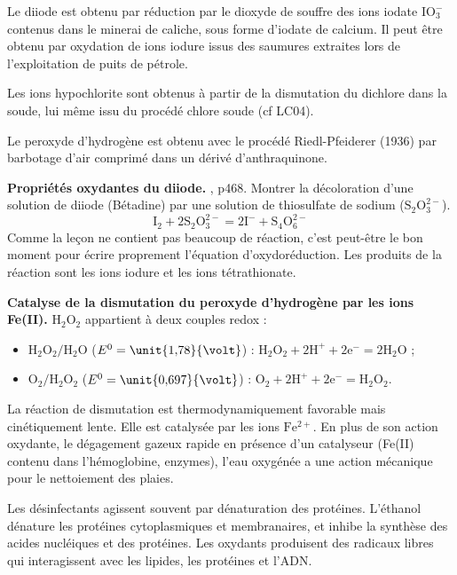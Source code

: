 \begin{remarque}
Le diiode est obtenu par réduction par le dioxyde de souffre des ions iodate $\mathrm{IO_3^-}$ contenus dans le minerai de caliche, sous forme d'iodate de calcium.
Il peut être obtenu par oxydation de ions iodure issus des saumures extraites lors de l'exploitation de puits de pétrole.

\noindent
Les ions hypochlorite sont obtenus à partir de la dismutation du dichlore dans la soude, lui même issu du procédé chlore soude (cf LC04).

\noindent
Le peroxyde d'hydrogène est obtenu avec le procédé Riedl-Pfeiderer (1936) par barbotage d'air comprimé dans un dérivé d'anthraquinone.
\end{remarque}

\begin{experience}
\textbf{Propriétés oxydantes du diiode.}
\cite{Dulaurans2012}, p468.
Montrer la décoloration d'une solution de diiode (Bétadine) par une solution de thiosulfate de sodium ($\mathrm{S_2O_3^{2-}}$).
\begin{equation}
\mathrm{I_2 + 2S_2O_3^{2-} = 2I^- + S_4O_6^{2-}}
\end{equation}
Comme la leçon ne contient pas beaucoup de réaction, c'est peut-être le bon moment pour écrire proprement l'équation d'oxydoréduction.
Les produits de la réaction sont les ions iodure et les ions tétrathionate. 
\end{experience}

\begin{experience}
\textbf{Catalyse de la dismutation du peroxyde d'hydrogène par les ions Fe(II).}
$\mathrm{H_2O_2}$ appartient à deux couples redox :
\begin{itemize}
\item $\mathrm{H_2O_2/H_2O}$ ($E^0 = \unit{1{,}78}{\volt}$) : $\mathrm{H_2O_2 + 2H^+ + 2e^- = 2H_2O}$ ;
\item $\mathrm{O_2/H_2O_2}$ ($E^0 = \unit{0{,}697}{\volt}$) : $\mathrm{O_2 + 2H^+ + 2e^- = H_2O_2}$.
\end{itemize}
La réaction de dismutation est thermodynamiquement favorable mais cinétiquement lente.
Elle est catalysée par les ions $\mathrm{Fe^{2+}}$.
En plus de son action oxydante, le dégagement gazeux rapide en présence d'un catalyseur (Fe(II) contenu dans l'hémoglobine, enzymes), l'eau oxygénée a une action mécanique pour le nettoiement des plaies.
\end{experience}

\begin{remarque}
Les désinfectants agissent souvent par dénaturation des protéines.
L'éthanol dénature les protéines cytoplasmiques et membranaires, et inhibe la synthèse  des acides nucléiques et des protéines.
Les oxydants produisent des radicaux libres qui interagissent avec les lipides, les protéines et l'ADN.
\end{remarque}

